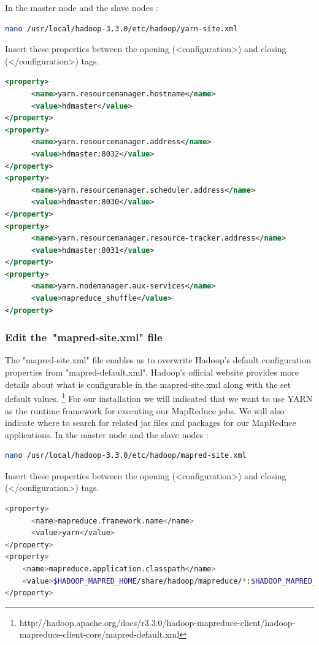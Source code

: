 \documentclass[12pt,english]{book}
\begin{document}
In the master node and the slave nodes :
\begin{lstlisting}[language=bash, frame=single]
nano /usr/local/hadoop-3.3.0/etc/hadoop/yarn-site.xml 
\end{lstlisting}
Insert these properties between the opening (<configuration>) and closing (</configuration>) tags. 
\begin{lstlisting}[language=xml, frame=single]
<property>
      <name>yarn.resourcemanager.hostname</name>
      <value>hdmaster</value>
</property>
<property>
      <name>yarn.resourcemanager.address</name>
      <value>hdmaster:8032</value>
</property>
<property>
      <name>yarn.resourcemanager.scheduler.address</name>
      <value>hdmaster:8030</value>
</property>
<property>
      <name>yarn.resourcemanager.resource-tracker.address</name>
      <value>hdmaster:8031</value>
</property>
<property>
      <name>yarn.nodemanager.aux-services</name>
      <value>mapreduce_shuffle</value>
</property>
\end{lstlisting}


\subsubsection{Edit the "mapred-site.xml" file}


The "mapred-site.xml" file enables us to overwrite Hadoop's default configuration properties from "mapred-default.xml".
Hadoop's official website provides more details about what is configurable in the mapred-site.xml along with the set default values.
\footnote{http://hadoop.apache.org/docs/r3.3.0/hadoop-mapreduce-client/hadoop-mapreduce-client-core/mapred-default.xml}
For our installation we will indicated that we want to use YARN as the runtime framework for executing our MapReduce jobs. We will also indicate where to search for related jar files and packages for our MapReduce applications.
In the master node and the slave nodes :
\begin{lstlisting}[language=bash, frame=single]
nano /usr/local/hadoop-3.3.0/etc/hadoop/mapred-site.xml 
\end{lstlisting}
Insert these properties between the opening (<configuration>) and closing (</configuration>) tags. 
\begin{lstlisting}[language=bash, frame=single]
<property>
      <name>mapreduce.framework.name</name>
      <value>yarn</value>
</property>
<property>
	<name>mapreduce.application.classpath</name>
	<value>$HADOOP_MAPRED_HOME/share/hadoop/mapreduce/*:$HADOOP_MAPRED_HOME/share/hadoop/mapreduce/lib/*</value>
</property>
\end{lstlisting}
\end{document}
